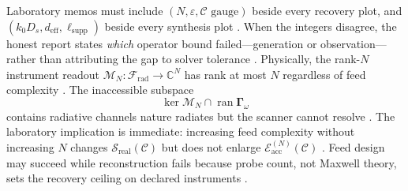 Laboratory memos must include $(N,\varepsilon,\mathcal{C}\text{ gauge})$ beside every recovery plot, and $(k_0 D_s,d_{\mathrm{eff}},\ell_{\mathrm{supp}})$ beside every synthesis plot \cite{poynting1884}. When the integers disagree, the honest report states \emph{which} operator bound failed---generation or observation---rather than attributing the gap to solver tolerance \cite{hansen1988}.
Physically, the rank-$N$ instrument readout $\mathcal{M}_N:\mathcal{F}_{\mathrm{rad}}\to\mathbb{C}^{N}$ has rank at most $N$ regardless of feed complexity \cite{harrington2001}. The inaccessible subspace
\begin{equation}
\label{eq:ch4.signature-nfscan-null}
\ker\mathcal{M}_N\cap \operatorname{ran}\boldsymbol{\Gamma}_\omega
\end{equation}
contains radiative channels nature radiates but the scanner cannot resolve \cite{devaney2004}. The laboratory implication is immediate: increasing feed complexity without increasing $N$ changes $\mathcal{S}_{\mathrm{real}}(\mathcal{C})$ but does not enlarge $\mathcal{E}_{\mathrm{acc}}^{(N)}(\mathcal{C})$ \cite{stratton1941}. Feed design may succeed while reconstruction fails because probe count, not Maxwell theory, sets the recovery ceiling on declared instruments \cite{devaney2004}.
